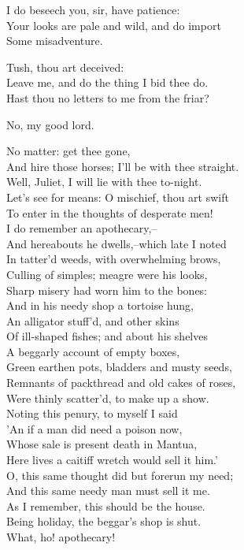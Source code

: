 \begin{speech}
I do beseech you, sir, have patience: \\
Your looks are pale and wild, and do import \\
Some misadventure. \\
\end{speech}
\begin{speech}
Tush, thou art deceived: \\
Leave me, and do the thing I bid thee do. \\
Hast thou no letters to me from the friar? \\
\end{speech}
\begin{speech}
No, my good lord. \\
\end{speech}
\begin{speech}
No matter: get thee gone, \\
And hire those horses; I'll be with thee straight.  \\
Well, Juliet, I will lie with thee to-night. \\
Let's see for means: O mischief, thou art swift \\
To enter in the thoughts of desperate men! \\
I do remember an apothecary,-- \\
And hereabouts he dwells,--which late I noted \\
In tatter'd weeds, with overwhelming brows, \\
Culling of simples; meagre were his looks, \\
Sharp misery had worn him to the bones: \\
And in his needy shop a tortoise hung, \\
An alligator stuff'd, and other skins \\
Of ill-shaped fishes; and about his shelves \\
A beggarly account of empty boxes, \\
Green earthen pots, bladders and musty seeds, \\
Remnants of packthread and old cakes of roses, \\
Were thinly scatter'd, to make up a show. \\
Noting this penury, to myself I said \\
'An if a man did need a poison now, \\
Whose sale is present death in Mantua, \\
Here lives a caitiff wretch would sell it him.' \\
O, this same thought did but forerun my need; \\
And this same needy man must sell it me. \\
As I remember, this should be the house. \\
Being holiday, the beggar's shop is shut. \\
What, ho! apothecary!  \\
\end{speech}
